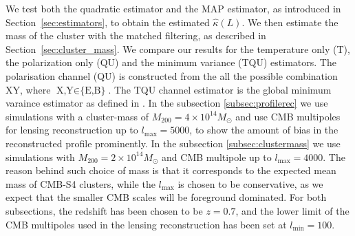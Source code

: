 \documentclass[prd, superscriptaddress, tightenlines, longbibliography, nofootinbib, eqsecnum, amsfonts, amsmath, floatfix, twocolumn, notitlepage]{revtex4-2}
\begin{document}
We test both the quadratic estimator and the MAP estimator, as introduced in Section~\ref{sec:estimators}, to obtain the estimated $\hat{\kappa}(L)$.
We then estimate the mass of the cluster with the matched filtering, as described in Section~\ref{sec:cluster_mass}. We compare our results for the temperature only (T), the polarization only (QU) and the minimum variance (TQU) estimators. The polarisation channel (QU) is constructed from the all the possible combination XY, where $\text{X,Y}\in \text{\{E,B\}}$. The TQU channel estimator is the global minimum varaince estimator as defined in \cite{Maniyar:2021msb}. In the subsection \ref{subsec:profilerec} we use simulations with a cluster-mass of $M_{200}  = 4\times 10^{14} M_{\odot}$ and use CMB multipoles for lensing reconstruction up to $l_{\text{max}}=5000$, to show the amount of bias in the reconstructed profile prominently. In the subsection \ref{subsec:clustermass} we use simulations with $M_{200}  = 2\times 10^{14} M_{\odot}$ and CMB multipole up to $l_{\text{max}}=4000$. The reason behind such choice of mass is that it corresponds to the expected mean mass of CMB-S4 clusters, while the $l_{\text{max}}$ is chosen to be conservative, as we expect that the smaller CMB scales will be foreground dominated. For both subsections, the redshift has been chosen to be $z=0.7$, and the lower limit of the CMB multipoles used in the lensing reconstruction has been set at $l_{\text{min}}=100$.
\end{document}
